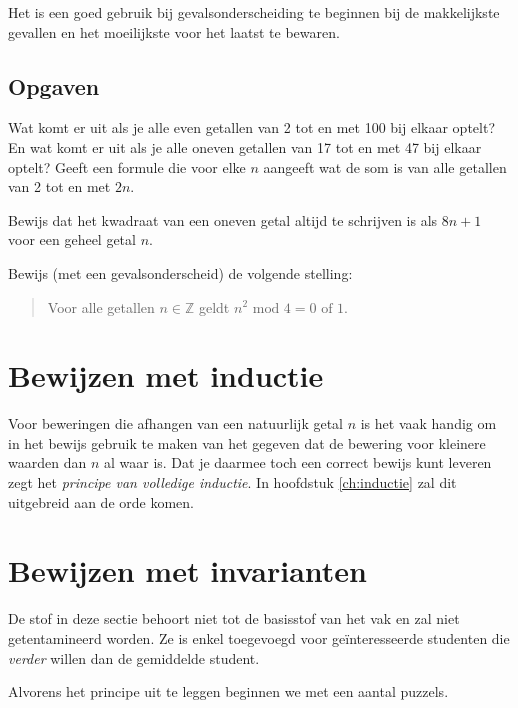 Het is een goed gebruik bij gevalsonderscheiding te beginnen bij de makkelijkste gevallen en het moeilijkste voor het laatst te bewaren.

\subsection{Opgaven}
\begin{exercise}[Optioneel]
Wat komt er uit als je alle even getallen van 2 tot en met 100 bij elkaar optelt? En wat komt er uit als je alle oneven getallen van 17 tot en met 47 bij elkaar optelt? Geeft een formule die voor elke $n$ aangeeft wat de som is van alle getallen van 2 tot en met $2n$.
\end{exercise}

\begin{exercise}[Optioneel]
Bewijs dat het kwadraat van een oneven getal altijd te schrijven is als $8n+1$ voor een geheel getal $n$.
\end{exercise}

\begin{exercise}[Optioneel]
Bewijs (met een gevalsonderscheid) de volgende stelling:
\begin{quote}
    Voor alle getallen $n\in\mathbb{Z}$ geldt $n^2 \text{ mod } 4 = 0\text{ of }1$.
\end{quote}
\end{exercise}

\section{Bewijzen met inductie}
Voor beweringen die afhangen van een natuurlijk getal $n$ is het vaak handig om in het bewijs gebruik te maken van het gegeven dat de bewering voor kleinere waarden dan $n$ al waar is. Dat je daarmee toch een correct bewijs kunt leveren zegt het \textit{principe van volledige inductie}. In hoofdstuk \ref{ch:inductie} zal dit uitgebreid aan de orde komen.

\section{Bewijzen met invarianten}
\begin{remark}
De stof in deze sectie behoort niet tot de basisstof van het vak en zal niet getentamineerd worden. Ze is enkel toegevoegd voor ge\"interesseerde studenten die \textit{verder} willen dan de gemiddelde student.
\end{remark}
Alvorens het principe uit te leggen beginnen we met een aantal puzzels.

